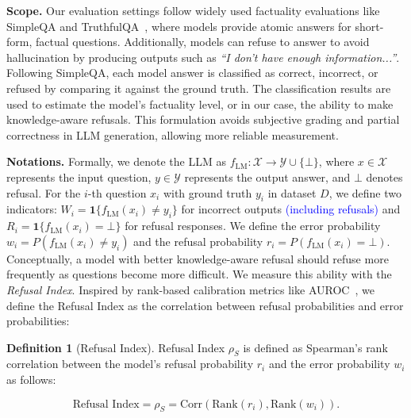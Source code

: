 \documentclass{article} %
\theoremstyle{definition}
\newtheorem{definition}{Definition}[section]
\newcommand{\wigglyblue}[1]{\textcolor{blue}{#1}}
\begin{document}
\noindent\textbf{Scope.} 
Our evaluation settings follow widely used factuality evaluations like SimpleQA and TruthfulQA~\citep{wei2024measuringshortformfactualitylarge, lin2022truthfulqameasuringmodelsmimic}, where models provide atomic answers for short-form, factual questions. 
Additionally, models can refuse to answer to avoid hallucination by producing outputs such as \emph{``I don't have enough information...''}.
Following SimpleQA, each model answer is classified as correct, incorrect, or refused by comparing it against the ground truth. 
The classification results are used to estimate the model's factuality level, or in our case, the ability to make knowledge-aware refusals.
This formulation avoids subjective grading and partial correctness in LLM generation, allowing more reliable measurement.

\noindent\textbf{Notations.}
Formally, we denote the LLM as $f_{\text{LM}}: \mathcal{X} \rightarrow \mathcal{Y} \cup \{\bot\}$, where $x \in \mathcal{X}$ represents the input question, $y \in \mathcal{Y}$ represents the output answer, and $\bot$ denotes refusal. 
For the $i$-th question $x_i$ with ground truth $y_i$ in dataset $D$, we define two indicators: $W_i = \mathbf{1}\{f_{\text{LM}}(x_i) \neq y_i\}$ for incorrect outputs \wigglyblue{(including refusals)} and $R_i = \mathbf{1}\{f_{\text{LM}}(x_i) = \bot\}$ for refusal responses. 
We define the error probability $w_i = P(f_{\text{LM}}(x_i) \neq y_i)$ and the refusal probability $r_i = P(f_{\text{LM}}(x_i) = \bot)$. 
Conceptually, a model with better knowledge-aware refusal should refuse more frequently as questions become more difficult. 
We measure this ability with the \emph{Refusal Index}. 
Inspired by rank-based calibration metrics like AUROC~\citep{NiculescuMizil2005PredictingGP}, we define the Refusal Index as the correlation between refusal probabilities and error probabilities:

\begin{definition}[Refusal Index]
Refusal Index $\rho_S$ is defined as Spearman's rank correlation between the model's refusal probability $r_i$ and the error probability $w_i$ as follows:

\vspace{-1em}
\begin{equation}
   \text{Refusal Index} = \rho_S  = \text{Corr}(\text{Rank}(r_i), \text{Rank}(w_i)).
\end{equation}
\vspace{-1.5em}

\end{definition}
\end{document}
